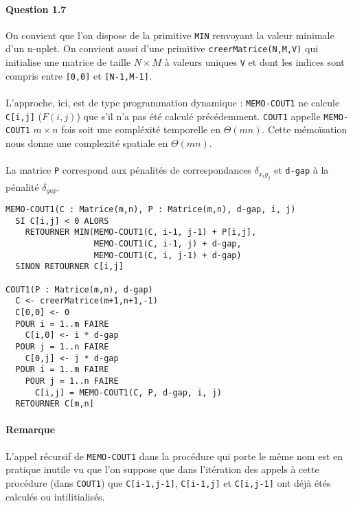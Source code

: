 \paragraph{Question 1.7}
On convient que l'on dispose de la primitive \verb'MIN' renvoyant la
valeur minimale d'un n-uplet. On convient aussi d'une primitive
\verb'creerMatrice(N,M,V)' qui initialise une matrice de taille
$N\times M$ \`a valeurs uniques \verb'V' et dont les indices sont
compris entre \verb'[0,0]' et \verb'[N-1,M-1]'.
\\\\
L'approche, ici, est de type programmation dynamique :
\verb'MEMO-COUT1' ne calcule \verb'C[i,j]' ($F(i,j)$) que s'il n'a pas
\'et\'e calcul\'e pr\'ec\'edemment. \verb'COUT1' appelle
\verb'MEMO-COUT1' $m\times n$ fois soit une compl\'exit\'e temporelle en
$\Theta(mn)$. Cette m\'emo\"isation nous donne une complexit\'e
spatiale en $\Theta(mn)$.
\\\\
La matrice \verb'P' correspond aux p\'enalit\'es de correspondances
$\delta_{x_iy_j}$ et \verb'd-gap' \`a la p\'enalit\'e $\delta_{gap}$.
\pagebreak
\begin{verbatim}
MEMO-COUT1(C : Matrice(m,n), P : Matrice(m,n), d-gap, i, j)
  SI C[i,j] < 0 ALORS
    RETOURNER MIN(MEMO-COUT1(C, i-1, j-1) + P[i,j],
                  MEMO-COUT1(C, i-1, j) + d-gap,
                  MEMO-COUT1(C, i, j-1) + d-gap)
  SINON RETOURNER C[i,j]

COUT1(P : Matrice(m,n), d-gap)
  C <- creerMatrice(m+1,n+1,-1)
  C[0,0] <- 0
  POUR i = 1..m FAIRE
    C[i,0] <- i * d-gap
  POUR j = 1..n FAIRE
    C[0,j] <- j * d-gap
  POUR i = 1..m FAIRE
    POUR j = 1..n FAIRE
      C[i,j] = MEMO-COUT1(C, P, d-gap, i, j)
  RETOURNER C[m,n]
\end{verbatim}
\paragraph{Remarque}
L'appel r\'ecursif de \verb'MEMO-COUT1' dans la proc\'edure qui porte
le m\^eme nom est en pratique inutile vu que l'on suppose que dans
l'it\'eration des appels \`a cette proc\'edure (dans \verb'COUT1') que
\verb'C[i-1,j-1]', \verb'C[i-1,j]' et \verb'C[i,j-1]' ont d\'ej\`a
\'et\'es calcul\'es ou intilitialis\'es.
